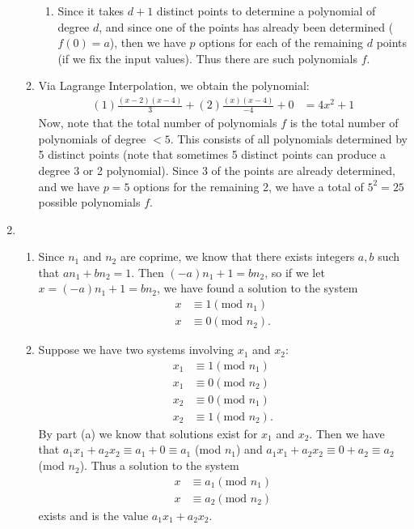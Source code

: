 \begin{enumerate}
\begin{enumerate}
\begin{enumerate}
            \item Since it takes $d+1$ distinct points to determine a polynomial of degree $d$, and since one of the points has already been determined ($f(0) = a$), then we have $p$ options for each of the remaining $d$ points (if we fix the input values). Thus there are  such polynomials $f$.
        \end{enumerate}
        
        \item Via Lagrange Interpolation, we obtain the polynomial:
        \begin{align*}
            (1)\frac{(x-2)(x-4)}{3} + (2)\frac{(x)(x-4)}{-4} + 0 &= \boxed{4x^2 + 1}
        \end{align*}
        Now, note that the total number of polynomials $f$ is the total number of polynomials of degree $<5$. This consists of all polynomials determined by 5 distinct points (note that sometimes 5 distinct points can produce a degree 3 or 2 polynomial). Since 3 of the points are already determined, and we have $p = 5$ options for the remaining 2, we have a total of $5^2 = \boxed{25}$ possible polynomials $f$.
        \end{enumerate}
        
        \item \begin{enumerate}
            \item Since $n_1$ and $n_2$ are coprime, we know that there exists integers $a,b$ such that $an_1 + bn_2 = 1$. Then $(-a)n_1 + 1 = bn_2$, so if we let $x = (-a)n_1 + 1 = bn_2$, we have found a solution to the system
            \begin{align*}
                x &\equiv 1 (\text{mod } n_1) \\
                x &\equiv 0 (\text{mod } n_2).
            \end{align*}
            
            \item Suppose we have two systems involving $x_1$ and $x_2$:
            \begin{align*}
                x_1 &\equiv 1 (\text{mod } n_1) \\
                x_1 &\equiv 0 (\text{mod } n_2) \\
                x_2 &\equiv 0 (\text{mod } n_1) \\
                x_2 &\equiv 1 (\text{mod } n_2).
            \end{align*}
            By part (a) we know that solutions exist for $x_1$ and $x_2$. Then we have that $a_1x_1 + a_2x_2 \equiv a_1 + 0 \equiv a_1$ (mod $n_1$) and $a_1x_1 + a_2x_2 \equiv 0 + a_2 \equiv a_2$ (mod $n_2$). Thus a solution to the system
            \begin{align*}
                x &\equiv a_1 (\text{mod } n_1) \\
                x &\equiv a_2 (\text{mod } n_2)
            \end{align*}
            exists and is the value $a_1x_1 + a_2x_2$.
            

\end{enumerate}
\end{enumerate}
